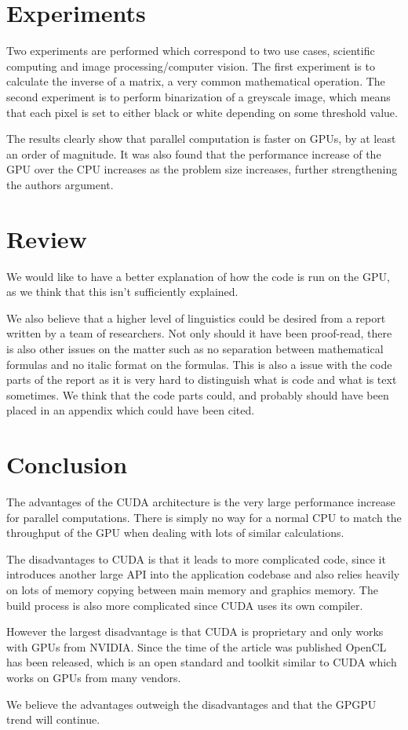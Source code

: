 \documentclass[titlepage, a4paper]{article}
\begin{document}
\section{Experiments}\label{sec:results}
Two experiments are performed which correspond to two use cases, scientific computing and image processing/computer vision. The first experiment is to calculate the inverse of a matrix, a very common mathematical operation. The second experiment is to perform binarization of a greyscale image, which means that each pixel is set to either black or white depending on some threshold value.

The results clearly show that parallel computation is faster on GPUs, by at least an order of magnitude. It was also found that the performance increase of the GPU over the CPU increases as the problem size increases, further strengthening the authors argument. 

\section{Review}\label{sec:review}
We would like to have a better explanation of how the code is run on the GPU, as we think that this isn't sufficiently explained.

We also believe that a higher level of linguistics could be desired from a report written by a team of researchers. Not only should it have been proof-read, there is also other issues on the matter such as no separation between mathematical formulas and no italic format on the formulas. This is also a issue with the code parts of the report as it is very hard to distinguish what is code and what is text sometimes. We think that the code parts could, and probably should have been placed in an appendix which could have been cited.

\section{Conclusion}\label{sec:conclusion}
The advantages of the CUDA architecture is the very large performance increase for parallel computations. There is simply no way for a normal CPU to match the throughput of the GPU when dealing with lots of similar calculations.

The disadvantages to CUDA is that it leads to more complicated code, since it introduces another large API into the application codebase and also relies heavily on lots of memory copying between main memory and graphics memory. The build process is also more complicated since CUDA uses its own compiler.

However the largest disadvantage is that CUDA is proprietary and only works with GPUs from NVIDIA. Since the time of the article was published OpenCL has been released, which is an open standard and toolkit similar to CUDA which works on GPUs from many vendors.

We believe the advantages outweigh the disadvantages and that the GPGPU trend will continue.
\end{document}
